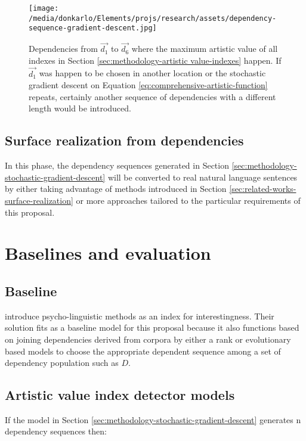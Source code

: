 \documentclass{article}
\begin{document}
	\begin{figure}[h!]
		\centering
		\texttt{[image: /media/donkarlo/Elements/projs/research/assets/dependency-sequence-gradient-descent.jpg]}
		\caption{Dependencies from $\vec{d_1}$ to $\vec{d_6}$ where the maximum artistic value of all indexes in Section \ref{sec:methodology-artistic value-indexes} happen. If $\vec{d_1}$ was happen to be chosen in another location or the stochastic gradient descent on Equation \ref{eq:comprehensive-artistic-function} repeats, certainly another sequence of dependencies with a different length would be introduced.} 
		\label{fig:dependency-gradient-descent}
	\end{figure}	
	\subsection{Surface realization from dependencies}
	In this phase, the dependency sequences generated in Section \ref{sec:methodology-stochastic-gradient-descent} will be converted to real natural language sentences by either taking advantage of methods introduced in Section \ref{sec:related-works-surface-realization} or more approaches tailored to the particular requirements of this proposal. 
	
	\section{Baselines and evaluation} \label{sec:baselines-evaluations}
	\subsection{Baseline}
	\citet{mcintyre-2009-learning-to-tell-tales-a-data-driven-approach-to-story-generation, mcintyre-2010-plot-induction-and-evolutionary-search-for-story-generation} introduce psycho-linguistic methods as an index for interestingness. Their solution fits as a baseline model for this proposal because it also functions based on joining dependencies derived from corpora by either a rank or evolutionary based models to choose the appropriate dependent sequence among a set of dependency population such as $D$. 
	\subsection{Artistic value index detector models} \label{sec:baselines-evaluations-artistic value-indexes}
	If the model in Section  \ref{sec:methodology-stochastic-gradient-descent} generates n dependency sequences then:
\end{document}
